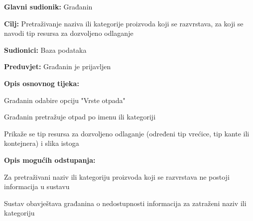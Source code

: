 			\noindent {}
			\begin{packed_item}
				
				\item \textbf{Glavni sudionik: }Građanin
				\item  \textbf{Cilj:} Pretraživanje naziva ili kategorije proizvoda koji se razvrstava, za koji se navodi tip resursa za dozvoljeno odlaganje
				\item  \textbf{Sudionici:} Baza podataka
				\item  \textbf{Preduvjet:} Građanin je prijavljen
				\item  \textbf{Opis osnovnog tijeka:}
				
				\item[] \begin{packed_enum}
					
					\item Građanin odabire opciju  "Vrste otpada"
					\item Građanin pretražuje otpad po imenu ili kategoriji
					\item Prikaže se tip resursa za dozvoljeno odlaganje (određeni tip vrećice, tip kante ili kontejnera) i slika istoga
				\end{packed_enum}
				
				\item  \textbf{Opis mogućih odstupanja:}
				
				\item[] \begin{packed_item}
					
					\item[2.a] Za pretraživani naziv ili kategoriju proizvoda koji se razvrstava ne postoji informacija u sustavu
					\item[] \begin{packed_enum}
						
						\item Sustav obavještava građanina o nedostupnosti informacija za zatraženi naziv ili kategoriju
						
					\end{packed_enum}
					
					
				\end{packed_item}
			\end{packed_item}
		
